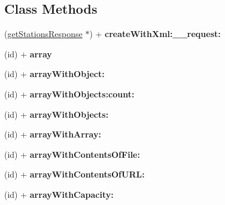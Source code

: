 \subsection*{Class Methods}
\begin{DoxyCompactItemize}
\item 
\hypertarget{interfaceget_stations_response_a69b3e373d17c8e678f7a4c83c898bf02}{}(\hyperlink{interfaceget_stations_response}{get\+Stations\+Response} $\ast$) + {\bfseries create\+With\+Xml\+:\+\_\+\+\_\+request\+:}\label{interfaceget_stations_response_a69b3e373d17c8e678f7a4c83c898bf02}

\item 
\hypertarget{interfaceget_stations_response_a3c32db2f63dd363bb4478158d3b4c4b8}{}(id) + {\bfseries array}\label{interfaceget_stations_response_a3c32db2f63dd363bb4478158d3b4c4b8}

\item 
\hypertarget{interfaceget_stations_response_a95e2920b89db14a8fdeeea7042564116}{}(id) + {\bfseries array\+With\+Object\+:}\label{interfaceget_stations_response_a95e2920b89db14a8fdeeea7042564116}

\item 
\hypertarget{interfaceget_stations_response_afc8d4f98bdf7f183b001dadcc91152f9}{}(id) + {\bfseries array\+With\+Objects\+:count\+:}\label{interfaceget_stations_response_afc8d4f98bdf7f183b001dadcc91152f9}

\item 
\hypertarget{interfaceget_stations_response_aa3b8878c1c5af0b36ca29e7bc86b76f6}{}(id) + {\bfseries array\+With\+Objects\+:}\label{interfaceget_stations_response_aa3b8878c1c5af0b36ca29e7bc86b76f6}

\item 
\hypertarget{interfaceget_stations_response_a5815c7ac8cb13c3be4c0d9cbcbe4ff90}{}(id) + {\bfseries array\+With\+Array\+:}\label{interfaceget_stations_response_a5815c7ac8cb13c3be4c0d9cbcbe4ff90}

\item 
\hypertarget{interfaceget_stations_response_ab22fd5f147a71ae584cf9ab605b3faaa}{}(id) + {\bfseries array\+With\+Contents\+Of\+File\+:}\label{interfaceget_stations_response_ab22fd5f147a71ae584cf9ab605b3faaa}

\item 
\hypertarget{interfaceget_stations_response_a2cf905ed8aee5a4ce1b49037b6e35ed2}{}(id) + {\bfseries array\+With\+Contents\+Of\+U\+R\+L\+:}\label{interfaceget_stations_response_a2cf905ed8aee5a4ce1b49037b6e35ed2}

\item 
\hypertarget{interfaceget_stations_response_a12617444e45a77495cbc3e2bd6974ece}{}(id) + {\bfseries array\+With\+Capacity\+:}\label{interfaceget_stations_response_a12617444e45a77495cbc3e2bd6974ece}

\end{DoxyCompactItemize}

